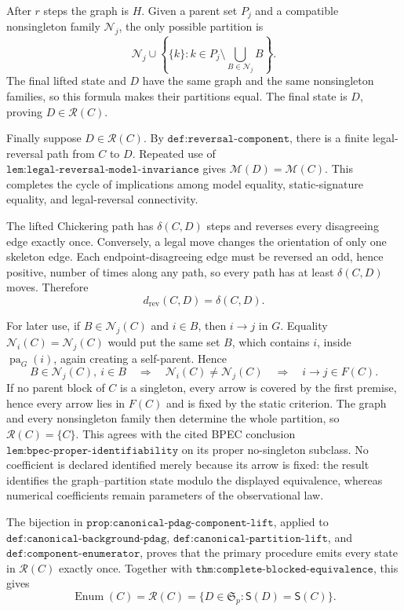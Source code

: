 After \(r\) steps the graph is \(H\). Given a parent set \(P_j\) and a compatible nonsingleton family \(\mathcal N_j\), the only possible partition is
\[
 \mathcal N_j\cup
 \left\{\{k\}:k\in P_j\setminus\bigcup_{B\in\mathcal N_j}B\right\}.
\]
The final lifted state and \(D\) have the same graph and the same nonsingleton families, so this formula makes their partitions equal. The final state is \(D\), proving \(D\in\mathcal R(C)\).

Finally suppose \(D\in\mathcal R(C)\). By \(\texttt{def:reversal-component}\), there is a finite legal-reversal path from \(C\) to \(D\). Repeated use of \(\texttt{lem:legal-reversal-model-invariance}\) gives \(\mathcal M(D)=\mathcal M(C)\). This completes the cycle of implications among model equality, static-signature equality, and legal-reversal connectivity.

The lifted Chickering path has \(\delta(C,D)\) steps and reverses every disagreeing edge exactly once. Conversely, a legal move changes the orientation of only one skeleton edge. Each endpoint-disagreeing edge must be reversed an odd, hence positive, number of times along any path, so every path has at least \(\delta(C,D)\) moves. Therefore
\[
 d_{\mathrm{rev}}(C,D)=\delta(C,D).
\]

For later use, if \(B\in\mathcal N_j(C)\) and \(i\in B\), then \(i\to j\) in \(G\). Equality \(\mathcal N_i(C)=\mathcal N_j(C)\) would put the same set \(B\), which contains \(i\), inside \(\operatorname{pa}_G(i)\), again creating a self-parent. Hence
\[
 B\in\mathcal N_j(C),\ i\in B
 \quad\Longrightarrow\quad
 \mathcal N_i(C)\neq\mathcal N_j(C)
 \quad\Longrightarrow\quad
 i\to j\in F(C).
\]
If no parent block of \(C\) is a singleton, every arrow is covered by the first premise, hence every arrow lies in \(F(C)\) and is fixed by the static criterion. The graph and every nonsingleton family then determine the whole partition, so \(\mathcal R(C)=\{C\}\). This agrees with the cited BPEC conclusion \(\texttt{lem:bpec-proper-identifiability}\) on its proper no-singleton subclass. No coefficient is declared identified merely because its arrow is fixed: the result identifies the graph--partition state modulo the displayed equivalence, whereas numerical coefficients remain parameters of the observational law.

The bijection in \(\texttt{prop:canonical-pdag-component-lift}\), applied to \(\texttt{def:canonical-background-pdag}\), \(\texttt{def:canonical-partition-lift}\), and \(\texttt{def:component-enumerator}\), proves that the primary procedure emits every state in \(\mathcal R(C)\) exactly once. Together with \(\texttt{thm:complete-blocked-equivalence}\), this gives
\[
 \operatorname{Enum}(C)=\mathcal R(C)
 =\{D\in\mathfrak S_p:\mathsf S(D)=\mathsf S(C)\}.
\]

